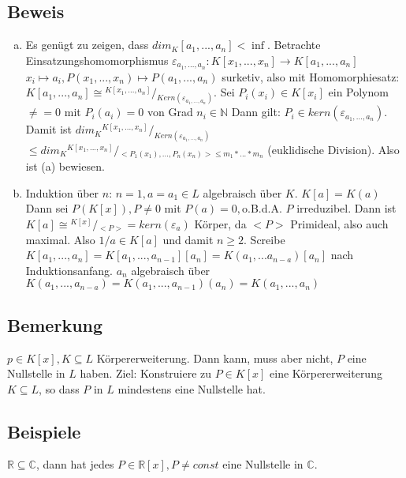 \documentclass[12pt,a4paper,ngerman]{scrreprt}
\newcommand{\modulus}[2]{{}^{#1} \!/\!_{#2}}
\begin{document}
\subsection{Beweis}
\begin{enumerate}[(a)]
\item Es genügt zu zeigen, dass $dim_K [a_1, ..., a_n] < \inf$. 
Betrachte Einsatzungshomomorphismus $\varepsilon_{a_1, ..., a_n} : K[x_1, ..., x_n] \to K[a_1, ..., a_n]$
$x_i \mapsto a_i, P(x_1, ..., x_n) \mapsto P(a_1, ..., a_n)$ surketiv, also mit Homomorphiesatz:
$K[a_1, ..., a_n] \cong \modulus{K[x_1, ..., a_n]}{Kern(\varepsilon_{a_1, ..., a_n})}$. 
Sei $P_i(x_i) \in K[x_i]$ ein Polynom $\neq = 0$ mit $P_i(a_i) = 0$ von Grad $n_i \in \mathbb{N}$ %
Dann gilt: $P_i \in kern(\varepsilon_{a_1, ..., a_n})$. Damit ist $dim_K \modulus{K[x_1, ..., x_n]}{Kern(\varepsilon_{a_1, ..., a_n})}$
$\leq dim_K \modulus{K[x_1, ..., x_n]}{<P_1(x_1), ..., P_n(x_n)> \leq m_1 * ... * m_n}$
(euklidische Division). Also ist (a) bewiesen.

\item Induktion über $n$: $n = 1, a=a_1 \in L$ algebraisch über $K$. $K[a] = K(a)$
Dann sei $P(K[x]), P \neq 0 $ mit $P(a)=0, $o.B.d.A. $P$ irreduzibel.
Dann ist $K[a] \cong \modulus{K[x]}{<P>} = kern(\varepsilon_a)$ Körper, da $<P>$ Primideal,
also auch maximal. Also $1/a \in K[a]$ und damit $n \geq 2$. %
Screibe $K[a_1, ..., a_n] = K[a_1, ..., a_{n-1}][a_n] = K(a_1, ... a_{n-a})[a_n]$ nach Induktionsanfang.
$a_n$ algebraisch über $K(a_1, ..., a_{n-a}) =  K(a_1, ..., a_{n-1})(a_n) = K(a_1, ..., a_n)$

\end{enumerate}


\subsection{Bemerkung}
$p \in K[x], K \subseteq L$ Körpererweiterung. 
Dann kann, muss aber nicht, $P$ eine Nullstelle in $L$ haben. 
Ziel: Konstruiere zu $P \in K[x]$ eine Körpererweiterung $K \subseteq L$, 
so dass $P$ in $L$ mindestens eine Nullstelle hat.

\subsection{Beispiele}
$\mathbb{R} \subseteq \mathbb{C}$, dann hat jedes $P \in \mathbb{R}[x], P \neq const$
eine Nullstelle in $\mathbb{C}$.
\end{document}
